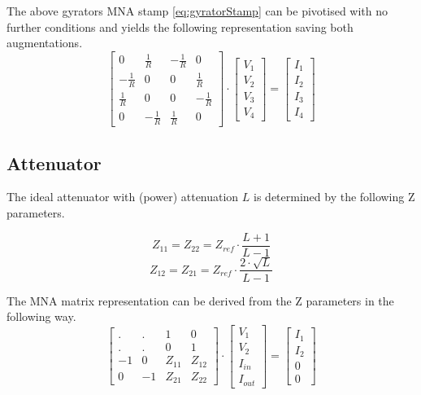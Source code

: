 The above gyrators MNA stamp \eqref{eq:gyratorStamp} can be pivotised
with no further conditions and yields the following representation
saving both augmentations.
\begin{equation}
\begin{bmatrix}
0&\frac{1}{R}&-\frac{1}{R}&0\\
-\frac{1}{R}&0&0&\frac{1}{R}\\
\frac{1}{R}&0&0&-\frac{1}{R}\\
0&-\frac{1}{R}&\frac{1}{R}&0
\end{bmatrix}
\cdot
\begin{bmatrix}
V_{1}\\
V_{2}\\
V_{3}\\
V_{4}
\end{bmatrix}
=
\begin{bmatrix}
I_{1}\\
I_{2}\\
I_{3}\\
I_{4}
\end{bmatrix}
\end{equation}

\subsection{Attenuator}
\label{sec:dc_attenuator}

The ideal attenuator with (power) attenuation $L$ is determined by the
following Z parameters.

\begin{equation}
Z_{11} = Z_{22} = Z_{ref}\cdot\frac{L+1}{L-1}
\end{equation}
\begin{equation}
Z_{12} = Z_{21} = Z_{ref}\cdot\frac{2\cdot\sqrt{L}}{L-1}
\end{equation}

The MNA matrix representation can be derived from the Z parameters in the
following way.
\begin{equation}
\begin{bmatrix}
 . & .  &  1 & 0\\
 . & .  &  0 & 1\\
-1 &  0 & Z_{11} & Z_{12}\\
 0 & -1 & Z_{21} & Z_{22}
\end{bmatrix}
\cdot
\begin{bmatrix}
V_{1}\\
V_{2}\\
I_{in}\\
I_{out}
\end{bmatrix}
=
\begin{bmatrix}
I_{1}\\
I_{2}\\
0\\
0
\end{bmatrix}
\end{equation}


